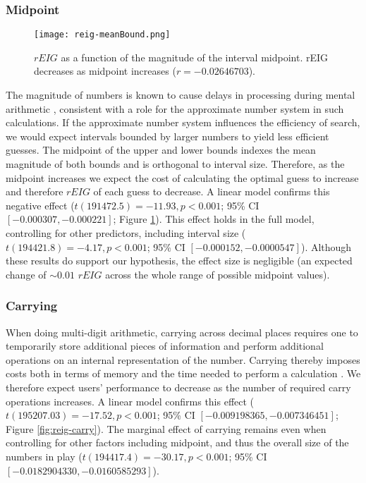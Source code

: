 \documentclass[10pt,letterpaper]{article}
\newcommand{\nums}[1]{\num[scientific-notation = true]{#1}}
\begin{document}
\subsubsection{Midpoint}
\begin{figure}[t]
\begin{center}
    \texttt{[image: reig-meanBound.png]}
\end{center}
    \vspace{-6mm}
    \caption{$rEIG$ as a function of the magnitude of the interval midpoint. rEIG decreases as midpoint increases ($r = \num{-0.02646703}$).
}
    \label{fig:reig-meanbound}
\vspace{-2mm}
\end{figure}
The magnitude of numbers is known to cause delays in processing during mental arithmetic \cite{DEHAENE2003145}, consistent with a role for the approximate number system in such calculations.
If the approximate number system influences the efficiency of search, we would expect intervals bounded by larger numbers to yield less efficient guesses. 
The midpoint of the upper and lower bounds indexes the mean magnitude of both bounds and is orthogonal to interval size.
Therefore, as the midpoint increases we expect the cost of calculating the optimal guess to increase and therefore $rEIG$ of each guess to decrease. A linear model confirms this negative effect ($t(191472.5) = -11.93, p<0.001$; 95\% CI $[\nums{-0.000307}, \nums{-0.000221}]$; Figure \ref{fig:reig-meanbound}). This effect holds in the full model, controlling for other predictors, including interval size ($t(194421.8) = -4.17, p<0.001$; 95\% CI $[\nums{-0.000152}, \nums{-0.0000547}]$). Although these results do support our hypothesis, the effect size is negligible (an expected change of $\sim0.01$  $rEIG$ across the whole range of possible midpoint values).


\subsubsection{Carrying}
When doing multi-digit arithmetic, carrying across decimal places requires one to temporarily store additional pieces of information and perform additional operations on an internal representation of the number. Carrying thereby imposes costs both in terms of memory and the time needed to perform a calculation \cite{imbo2007role2}. We therefore expect users' performance to decrease as the number of required carry operations increases.
A linear model confirms this effect ($t(195207.03) = -17.52, p<0.001$; 95\% CI $[\num{-0.009198365}, \num{-0.007346451}]$; Figure \ref{fig:reig-carry}). The marginal effect of carrying remains even when controlling for other factors including midpoint, and thus the overall size of the numbers in play ($t(194417.4) = -30.17, p<0.001$; 95\% CI $[\num{-0.0182904330}, \num{-0.0160585293}]$).
\end{document}
